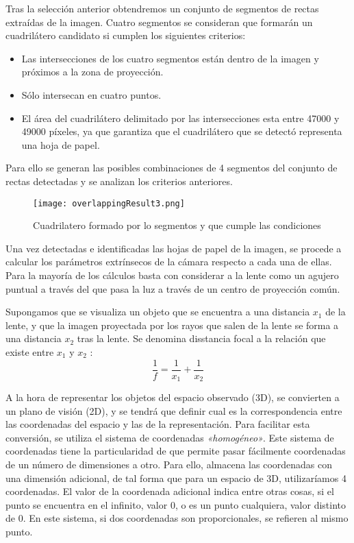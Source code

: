Tras la selección anterior obtendremos un conjunto de segmentos de rectas extraídas de la
imagen. Cuatro segmentos se consideran que formarán un cuadrilátero candidato si cumplen los
siguientes criterios:
\begin{itemize}
\item Las intersecciones de los cuatro segmentos están dentro de la imagen y próximos a la zona de
  proyección.
\item Sólo intersecan en cuatro puntos.
\item El área del cuadrilátero delimitado por las intersecciones esta entre 47000 y 49000 píxeles,
  ya que garantiza que el cuadrilátero que se detectó representa una hoja de papel.
\end{itemize}

Para ello se generan las posibles combinaciones de 4 segmentos del conjunto de rectas detectadas y
se analizan los criterios anteriores.
\begin{figure}[h!] 
    \centering
    \texttt{[image: overlappingResult3.png]}
    \caption{Cuadrilatero formado por lo segmentos y que cumple las condiciones}
    \label{fig:overlappingResult}
  \end{figure}

Una vez detectadas e identificadas las hojas de papel de la imagen, se procede a calcular los parámetros extrínsecos de la cámara respecto a cada una de ellas. Para la mayoría de los cálculos basta con considerar a la lente como un agujero puntual a través del que pasa la luz a través de un centro de proyección común.



Supongamos que se visualiza un objeto que se encuentra a una distancia $x_{1}$ de la lente, y que la
imagen proyectada por los rayos que salen de la lente se forma a una distancia $x_{2}$ tras la
lente. Se denomina disstancia focal a la relación que existe entre $x_{1}$ y $x_{2}$ :
\begin{equation}
\dfrac{1}{f} = \dfrac{1}{x_{1}} + \dfrac{1}{x_{2}}
\end{equation}

A la hora de representar los objetos del espacio observado (3D), se convierten a un plano de
visión (2D), y se tendrá que definir cual es la correspondencia entre las coordenadas del espacio y las de la representación. Para facilitar esta conversión, se utiliza el sistema de coordenadas \emph{«homogéneo»}. Este sistema de coordenadas tiene la particularidad de que permite pasar fácilmente coordenadas de un número de dimensiones a otro. Para ello, almacena las coordenadas con una dimensión adicional, de tal forma que para un espacio de 3D, utilizaríamos 4 coordenadas. El valor de la coordenada adicional indica entre otras cosas, si el punto se encuentra en el infinito, valor 0, o es un punto cualquiera, valor distinto de 0. En este sistema, si dos coordenadas son proporcionales, se refieren al mismo punto.

